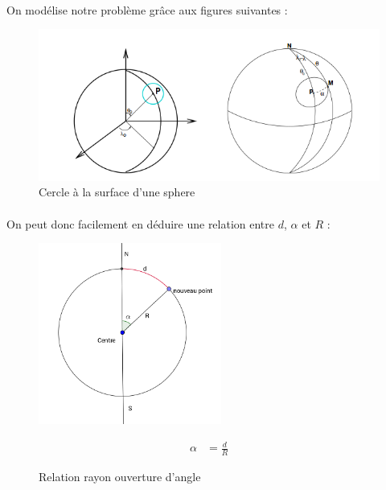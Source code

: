 \documentclass[a4paper]{report}
\begin{document}
\paragraph{} On modélise notre problème grâce aux figures suivantes :

\begin{figure}[H]
	\begin{center}
		\includegraphics[width=400pt]{image/sprint2_petits-cercles}
		\caption{Cercle à la surface d'une sphere}
		\label{Cercle à la surface d'une sphere}
	\end{center}
\end{figure}

\paragraph{} On peut donc facilement en déduire une relation entre $d$, $\alpha$ et $R$ :

\begin{figure}[H]
	\begin{minipage}[c]{.46\linewidth}
		\begin{center}
			\includegraphics[width=6cm]{image/relation_angle_rayon}
       			\caption{Relation rayon ouverture d'angle}
			\label{Relation rayon ouverture d'angle}
		\end{center}
	\end{minipage} \hfill
	\begin{minipage}[c]{.46\linewidth}
		\begin{align}
			\alpha &= \frac{d}{R}
		\end{align}
	\end{minipage}
\end{figure}	
\end{document}
